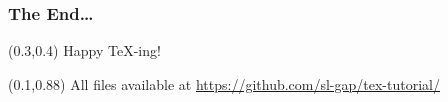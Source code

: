 \documentclass[t,ngerman,compress]{beamer}
\begin{document}
{
\begin{frame}
  \frametitle{The End\dots}
  \begin{textblock}{10}(0.3,0.4)
    {\Huge\color{red}Happy \TeX-ing!}
  \end{textblock}
  \begin{textblock}{10}(0.1,0.88)
    \small All files available at
    \href{https://github.com/sl-gap/tex-tutorial/}{https://github.com/sl-gap/tex-tutorial/}
  \end{textblock}
\end{frame}
}
\end{document}
